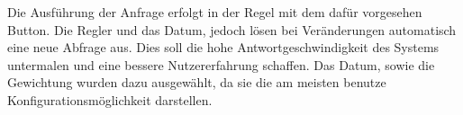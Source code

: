Die Ausführung der Anfrage erfolgt in der Regel mit dem dafür vorgesehen Button. Die Regler und das Datum, jedoch lösen bei Veränderungen automatisch eine neue Abfrage aus. Dies soll die hohe Antwortgeschwindigkeit des Systems untermalen und eine bessere Nutzererfahrung schaffen. Das Datum, sowie die Gewichtung wurden dazu ausgewählt, da sie die am meisten benutze Konfigurationsmöglichkeit darstellen.


